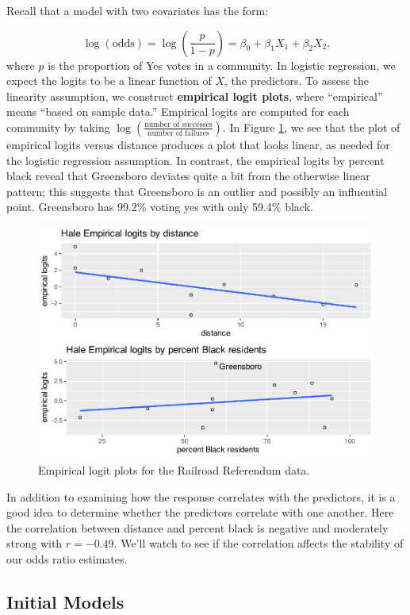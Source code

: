 \documentclass[
]{krantz}
\begin{document}
Recall that a model with two covariates has the form:

\[\log(\textrm{odds}) = \log\left(\frac{p}{1-p}\right) = \beta_0+\beta_1X_1+\beta_2X_2.\]
where \(p\) is the proportion of Yes votes in a community. In logistic regression, we expect the logits to be a linear function of \(X\), the predictors. To assess the linearity assumption, we construct \textbf{empirical logit plots},  where ``empirical'' means ``based on sample data.'' Empirical logits are computed for each community by taking \(\log\left(\frac{\textrm{number of successes}}{\textrm{number of failures}}\right)\). In Figure \ref{fig:emplogits}, we see that the plot of empirical logits versus distance produces a plot that looks linear, as needed for the logistic regression assumption. In contrast, the empirical logits by percent black reveal that Greensboro deviates quite a bit from the otherwise linear pattern; this suggests that Greensboro is an outlier and possibly an influential point. Greensboro has 99.2\% voting yes with only 59.4\% black.

\begin{figure}

{\centering \includegraphics[width=0.6\linewidth]{bookdown-BeyondMLR_files/figure-latex/emplogits-1} 

}

\caption{Empirical logit plots for the Railroad Referendum data.}\label{fig:emplogits}
\end{figure}

In addition to examining how the response correlates with the predictors, it is a good idea to determine whether the predictors correlate with one another. Here the correlation between distance and percent black is negative and moderately strong with \(r = -0.49\). We'll watch to see if the correlation affects the stability of our odds ratio estimates.

\hypertarget{initial-models-1}{%
\subsection{Initial Models}\label{initial-models-1}}
\end{document}
